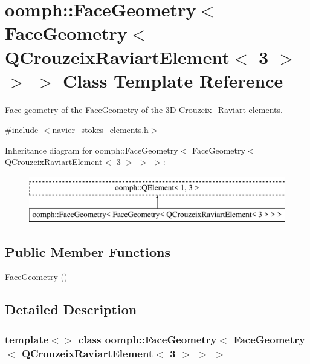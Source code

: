 \hypertarget{classoomph_1_1FaceGeometry_3_01FaceGeometry_3_01QCrouzeixRaviartElement_3_013_01_4_01_4_01_4}{}\section{oomph\+:\+:Face\+Geometry$<$ Face\+Geometry$<$ Q\+Crouzeix\+Raviart\+Element$<$ 3 $>$ $>$ $>$ Class Template Reference}
\label{classoomph_1_1FaceGeometry_3_01FaceGeometry_3_01QCrouzeixRaviartElement_3_013_01_4_01_4_01_4}


Face geometry of the \hyperlink{classoomph_1_1FaceGeometry}{Face\+Geometry} of the 3D Crouzeix\+\_\+\+Raviart elements.  




{\ttfamily \#include $<$navier\+\_\+stokes\+\_\+elements.\+h$>$}

Inheritance diagram for oomph\+:\+:Face\+Geometry$<$ Face\+Geometry$<$ Q\+Crouzeix\+Raviart\+Element$<$ 3 $>$ $>$ $>$\+:\begin{figure}[H]
\begin{center}
\leavevmode
\includegraphics[height=2.000000cm]{classoomph_1_1FaceGeometry_3_01FaceGeometry_3_01QCrouzeixRaviartElement_3_013_01_4_01_4_01_4}
\end{center}
\end{figure}
\subsection*{Public Member Functions}
\begin{DoxyCompactItemize}
\item 
\hyperlink{classoomph_1_1FaceGeometry_3_01FaceGeometry_3_01QCrouzeixRaviartElement_3_013_01_4_01_4_01_4_a6bc0b46a8283deaa65f61610cf0d2591}{Face\+Geometry} ()
\end{DoxyCompactItemize}


\subsection{Detailed Description}
\subsubsection*{template$<$$>$\newline
class oomph\+::\+Face\+Geometry$<$ Face\+Geometry$<$ Q\+Crouzeix\+Raviart\+Element$<$ 3 $>$ $>$ $>$}

